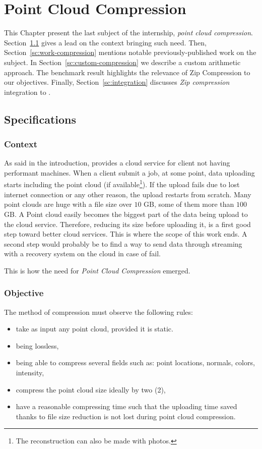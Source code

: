 \chapter{Point Cloud Compression}
\label{ch:compression}
This Chapter present the last subject of the internship, \emph{point cloud compression}. Section~\ref{sc:spec-compression} gives a lead on the context bringing such need. Then, Section~\ref{sc:work-compression} mentions notable previously-published work on the subject. In Section~\ref{sc:custom-compression} we describe a custom arithmetic approach. The benchmark result highlights the relevance of Zip Compression to our objectives. Finally, Section~\ref{sc:integration}
discusses \emph{Zip compression} integration to \CC.

\section{Specifications}
\label{sc:spec-compression}

\subsection{Context}
As said in the introduction, \CC provides a cloud service for client not having performant machines. When a client submit a job, at some point, data uploading starts including the point cloud (if available\footnote{The reconstruction can also be made with photos.}). If the upload fails due to lost internet connection or any other reason, the upload restarts from scratch. Many point clouds are huge with a file size over $10$ GB, some of them more than $100$ GB. A Point cloud
easily becomes the biggest part of the data being upload to the cloud service. Therefore, reducing its size before uploading it, is a first good step toward better cloud services. This is where the scope of this work ends. A second step would probably be to find a way to send data through streaming with a recovery system on the cloud in case of fail.

This is how the need for \emph{Point Cloud Compression} emerged.

\subsection{Objective}
The method of compression must observe the following rules:
\begin{itemize}
  \item take as input any point cloud, provided it is static.
  \item being lossless,
  \item being able to compress several fields such as: point locations, normals, colors, intensity,
  \item compress the point cloud size ideally by two (2),
  \item have a reasonable compressing time such that the uploading time saved thanks to file size reduction is not lost during point cloud compression.
\end{itemize}

